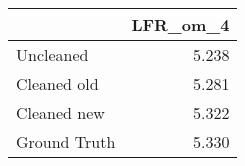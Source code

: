 \begin{tabular}{lr}
\toprule
{} & LFR_om_4 \\
\midrule
Uncleaned    &    5.238 \\
Cleaned old  &    5.281 \\
Cleaned new  &    5.322 \\
Ground Truth &    5.330 \\
\bottomrule
\end{tabular}
